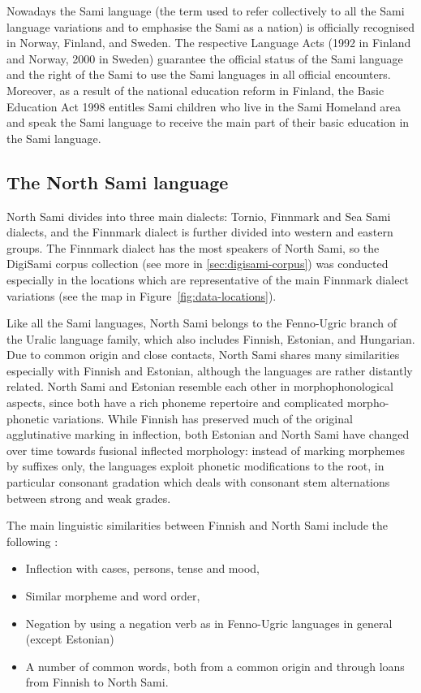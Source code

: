 \documentclass[runningheads,a4paper]{llncs}
\begin{document}
Nowadays the Sami language (the term used to refer collectively to all the Sami language variations and to emphasise the Sami as a nation) is officially recognised in Norway, Finland, and Sweden. The respective Language Acts (1992 in Finland and Norway, 2000 in Sweden) guarantee the official status of the Sami language and the right of the Sami to use the Sami languages in all official encounters. Moreover, as a result of the national education reform in Finland, the Basic Education Act 1998 entitles Sami children who live in the Sami Homeland area and speak the Sami language to receive the main part of their basic education in the Sami language.

\subsection{The North Sami language}
\label{sec:north-sami}

North Sami divides into three main dialects: Tornio, Finnmark and Sea Sami dialects, and the Finnmark dialect is further divided into western and eastern groups. The Finnmark dialect has the most speakers of North Sami, so the DigiSami corpus collection (see more in \ref{sec:digisami-corpus}) was conducted especially in the locations which are representative of the main Finnmark dialect variations (see the map in
Figure~\ref{fig:data-locations}).

Like all the Sami languages, North Sami belongs to the Fenno-Ugric branch of the Uralic language family, which also includes Finnish, Estonian, and Hungarian. Due to common origin and close contacts, North Sami shares many similarities especially with Finnish and Estonian, although the languages are rather distantly related. North Sami and Estonian resemble each other in morphophonological aspects, since both have a rich phoneme repertoire and complicated morpho-phonetic variations. While Finnish has preserved much of the original agglutinative marking in inflection, both Estonian and North Sami have changed over time towards fusional inflected morphology: instead of marking morphemes by suffixes only, the languages exploit phonetic modifications to the root, in particular consonant gradation which deals with consonant stem alternations between strong and weak grades.

The main linguistic similarities between Finnish and North Sami include the following \cite{Sammallahti:98}:

\begin{itemize}
\item Inflection with cases, persons, tense and mood,
\item Similar morpheme and word order,
\item Negation by using a negation verb as in Fenno-Ugric languages in general (except Estonian)
\item A number of common words, both from a common origin and through loans from Finnish to North Sami.
\end{itemize}
\end{document}
